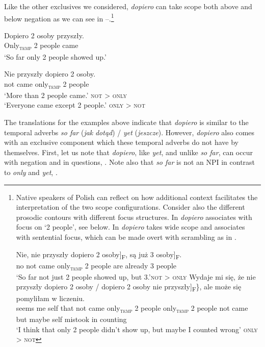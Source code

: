 \documentclass[output=paper,colorlinks,citecolor=brown]{langscibook}
\begin{document}
\noindent Like the other exclusives we considered, \textit{dopiero} can take scope both above and below negation as we can see in --.\footnote{Native speakers of Polish can reflect on how additional context facilitates the interpretation of the two scope configurations. Consider also the different prosodic contours with different focus structures. In  \textit{dopiero} associates with focus on ‘2 people’, see  below. In  \textit{dopiero} takes wide scope and associates with sentential focus, which can be made overt with scrambling as in .

\ea\label{ex:tom:fni} 
\ea\label{ex:tom:fnia} 
\gll Nie, nie przyszły dopiero \minsp{[} 2 osoby]\textsubscript{F}, są już \minsp{[} 3 osoby]\textsubscript{F}.\\
no not came only\textsubscript{\textsc{temp}} {} 2 people are already {} 3 people\\
\glt `So far not just 2 people showed up, but 3.’\hfill \textsc{not} > \textsc{only}
\ex\label{ex:tom:fnib} 
\gll Wydaje mi się, że \minsp{\{} nie przyszły dopiero 2 osoby / dopiero \minsp{[} 2 osoby nie przyszły]\textsubscript{F}\}, ale może się pomyliłam w liczeniu.\\
seems me self that {} not came only\textsubscript{\textsc{temp}} 2 people {} only\textsubscript{\textsc{temp}} {} 2 people not came but maybe self mistook in counting\\
\glt `I think that only 2 people didn't show up, but maybe I counted wrong’ \hfill \textsc{only} > \textsc{not}
\z 
\z
}

\ea\label{ex:tom:49}
\gll Dopiero 2 osoby przyszły.\\
Only\textsubscript{\textsc{temp}} 2 people came\\
\glt `So far only 2 people showed up.’
\z 

\ea\label{ex:tom:50}
\gll Nie przyszły dopiero 2 osoby.\\
not came only\textsubscript{\textsc{temp}} 2 people\\
\ea\label{ex:tom:50a} 
‘More than 2 people came.’   \hfill \textsc{not} > \textsc{only}\\
\ex\label{ex:tom:50b} 
‘Everyone came except 2 people.’ \hfill \textsc{only} > \textsc{not}
\z 
\z 

\noindent The translations for the examples above indicate that \textit{dopiero} is similar to the temporal adverbs \textit{so far} (\textit{jak} \textit{dotąd}) / \textit{yet} (\textit{jeszcze}). However, \textit{dopiero} also comes with an exclusive component which these temporal adverbs do not have by themselves. First, let us note that \textit{dopiero}, like \textit{yet}, and unlike \textit{so far}, can occur with negation and in questions, . Note also that  \textit{so far} is not an NPI in contrast to \textit{only} and \textit{yet}, . 
\end{document}
